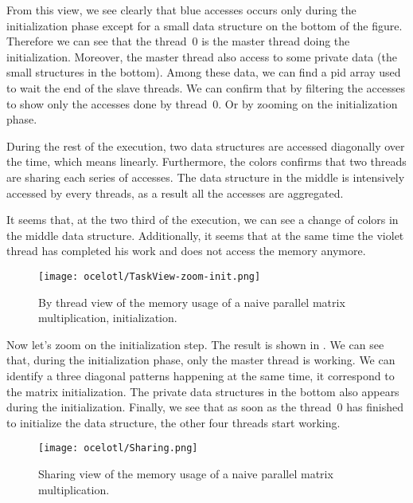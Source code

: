 From this view, we see clearly that blue accesses occurs only during the initialization phase except for a small data structure on the bottom of the figure.
Therefore we can see that the thread~$0$ is the master thread doing the initialization.
Moreover, the master thread also access to some private data (the small structures in the bottom).
Among these data, we can find a pid array used to wait the end of the slave threads.
We can confirm that by filtering the accesses to show only the accesses done by thread~$0$.
Or by zooming on the initialization phase.

During the rest of the execution, two data structures are accessed diagonally over the time, which means linearly.
Furthermore, the colors confirms that two threads are sharing each series of accesses.
The data structure in the middle is intensively accessed by every threads, as a result all the accesses are aggregated.

It seems that, at the two third of the execution, we can see a change of colors in the middle data structure.
Additionally, it seems that at the same time the violet thread has completed his work and does not access the memory anymore.

\begin{figure}[htb]
    \centering
    \texttt{[image: ocelotl/TaskView-zoom-init.png]}
    \caption{By thread view of the memory usage of a naive parallel matrix multiplication,
    initialization.}
    \label{fig:ocelotl-th1}
\end{figure}

Now let's zoom on the initialization step.
The result is shown in .
We can see that, during the initialization phase, only the master thread is working.
We can identify a three diagonal patterns happening at the same time, it correspond to the matrix initialization.
The private data structures in the bottom also appears during the initialization.
Finally, we see that as soon as the thread~$0$ has finished to initialize the data structure, the other four threads start working.

\begin{figure}[htb]
    \centering
    \texttt{[image: ocelotl/Sharing.png]}
    \caption{Sharing view of the memory usage of a naive parallel matrix multiplication.}
    \label{fig:ocelotl-carto0}
\end{figure}

